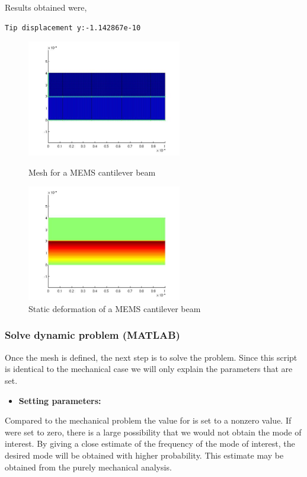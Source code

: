 Results obtained were,
\begin{verbatim}
Tip displacement y:-1.142867e-10
\end{verbatim}

\begin{figure}[htbp]
\centering
\includegraphics[height = 2in]{fig/mems_cant_em_mesh.jpg}
\caption{Mesh for a MEMS cantilever beam}
\label{fig:MEMSCantileverBeamEMMesh}
\includegraphics[height = 2in]{fig/mems_cant_em_sta.jpg}
\caption{Static deformation of a MEMS cantilever beam}
\label{fig:MEMSCantileverBeamEMStatic}
\end{figure}



\clearpage
\subsubsection*{Solve dynamic problem (MATLAB)}
Once the mesh is defined, the next step is to solve the problem.
Since this script is identical to the mechanical case we will only
explain the parameters that are set.
\begin{itemize}

  \item{\textbf{Setting parameters:}}

\end{itemize}
Compared to the mechanical problem the value for  is set to a
nonzero value. If  were set to zero, there is a large possibility
that we would not obtain the mode of interest. By giving a close estimate
of the frequency of the mode of interest, the desired mode will be
obtained with higher probability. This estimate  may be obtained
from the purely mechanical analysis.

